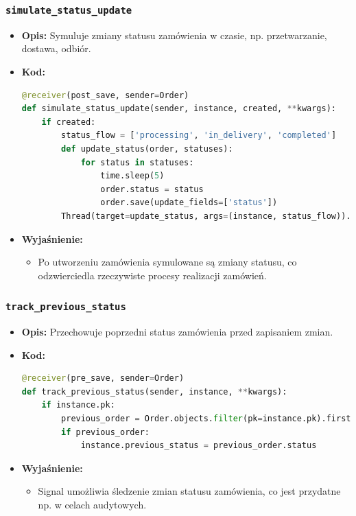 \documentclass[12pt,a4paper,oneside]{article}
\theoremstyle{definition}
\numberwithin{equation}{section}
\begin{document}
\subsubsection*{\texttt{simulate\_status\_update}}
\begin{itemize}
    \item \textbf{Opis:} Symuluje zmiany statusu zamówienia w czasie, np. przetwarzanie, dostawa, odbiór.
    \item \textbf{Kod:}
\begin{lstlisting}[language=Python]
@receiver(post_save, sender=Order)
def simulate_status_update(sender, instance, created, **kwargs):
    if created:
        status_flow = ['processing', 'in_delivery', 'completed']
        def update_status(order, statuses):
            for status in statuses:
                time.sleep(5)
                order.status = status
                order.save(update_fields=['status'])
        Thread(target=update_status, args=(instance, status_flow)).start()
\end{lstlisting}
    \item \textbf{Wyjaśnienie:}
    \begin{itemize}
        \item Po utworzeniu zamówienia symulowane są zmiany statusu, co odzwierciedla rzeczywiste procesy realizacji zamówień.
    \end{itemize}
\end{itemize}

\subsubsection*{\texttt{track\_previous\_status}}
\begin{itemize}
    \item \textbf{Opis:} Przechowuje poprzedni status zamówienia przed zapisaniem zmian.
    \item \textbf{Kod:}
\begin{lstlisting}[language=Python]
@receiver(pre_save, sender=Order)
def track_previous_status(sender, instance, **kwargs):
    if instance.pk:
        previous_order = Order.objects.filter(pk=instance.pk).first()
        if previous_order:
            instance.previous_status = previous_order.status
\end{lstlisting}
    \item \textbf{Wyjaśnienie:}
    \begin{itemize}
        \item Signal umożliwia śledzenie zmian statusu zamówienia, co jest przydatne np. w celach audytowych.
    \end{itemize}
\end{itemize}
\end{document}
